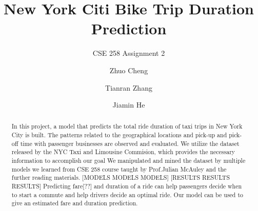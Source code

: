 \documentclass[sigconf]{acmart}
\begin{document}
\title{New York Citi Bike Trip Duration Prediction}
\subtitle{CSE 258 Assignment 2}



\author{Zhuo Cheng}

\author{Tianran Zhang}


\author{Jiamin He}




\begin{abstract}
  In this project, a model that predicts the total ride duration of taxi trips in New York City is built. The patterns related to the geographical locations and pick-up and pick-off time with passenger businesses are observed and evaluated. We utilize the dataset released by the NYC Taxi and Limousine Commision, which provides the necessary information to accomplish our goal
  We manipulated and mined the dataset by multiple models we learned from CSE 258 course taught by Prof.Julian McAuley and the further reading materials. [MODELS MODELS MODELS] [RESULTS RESULTS RESULTS] Predicting fare[??] and duration of a ride can help passengers decide when to start a commute and help drivers decide an optimal ride. Our model can be used to give an estimated fare and duration prediction.


\end{abstract}




\maketitle




 
\end{document}
